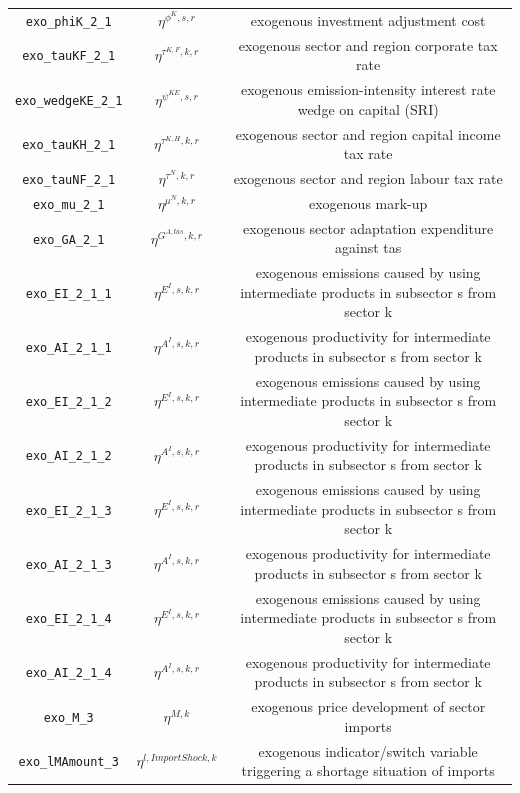 \begin{center}
\begin{longtable}{ccc}
\texttt{exo\_phiK\_2\_1} & ${\eta^{\phi^{K},{s,r}}}$ & exogenous investment adjustment cost\\
\texttt{exo\_tauKF\_2\_1} & ${\eta^{\tau^{K,F},k,r}}$ & exogenous sector and region corporate tax rate\\
\texttt{exo\_wedgeKE\_2\_1} & ${\eta^{\psi^{KE},s,r}}$ & exogenous emission-intensity interest rate wedge on capital (SRI)\\
\texttt{exo\_tauKH\_2\_1} & ${\eta^{\tau^{K,H},k,r}}$ & exogenous sector and region capital income tax rate\\
\texttt{exo\_tauNF\_2\_1} & ${\eta^{\tau^{N},k,r}}$ & exogenous sector and region labour tax rate\\
\texttt{exo\_mu\_2\_1} & ${\eta^{\mu^{N},k,r}}$ & exogenous mark-up\\
\texttt{exo\_GA\_2\_1} & ${\eta^{G^{A,tas},k,r}}$ & exogenous sector adaptation expenditure against tas\\
\texttt{exo\_EI\_2\_1\_1} & ${\eta^{E^{I},s,k,r}}$ & exogenous emissions caused by using intermediate products in subsector s from sector k\\
\texttt{exo\_AI\_2\_1\_1} & ${\eta^{A^{I},s,k,r}}$ & exogenous productivity for intermediate products in subsector s from sector k\\
\texttt{exo\_EI\_2\_1\_2} & ${\eta^{E^{I},s,k,r}}$ & exogenous emissions caused by using intermediate products in subsector s from sector k\\
\texttt{exo\_AI\_2\_1\_2} & ${\eta^{A^{I},s,k,r}}$ & exogenous productivity for intermediate products in subsector s from sector k\\
\texttt{exo\_EI\_2\_1\_3} & ${\eta^{E^{I},s,k,r}}$ & exogenous emissions caused by using intermediate products in subsector s from sector k\\
\texttt{exo\_AI\_2\_1\_3} & ${\eta^{A^{I},s,k,r}}$ & exogenous productivity for intermediate products in subsector s from sector k\\
\texttt{exo\_EI\_2\_1\_4} & ${\eta^{E^{I},s,k,r}}$ & exogenous emissions caused by using intermediate products in subsector s from sector k\\
\texttt{exo\_AI\_2\_1\_4} & ${\eta^{A^{I},s,k,r}}$ & exogenous productivity for intermediate products in subsector s from sector k\\
\texttt{exo\_M\_3} & ${\eta^{M,k}}$ & exogenous price development of sector imports\\
\texttt{exo\_lMAmount\_3} & ${\eta^{l,Import Shock,k}}$ & exogenous indicator/switch variable triggering a shortage situation of imports\\

\end{longtable}
\end{center}
